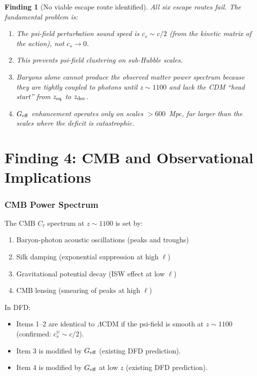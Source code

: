 \documentclass[11pt]{article}
\newtheorem{finding}{Finding}
\newcommand{\LCDM}{$\Lambda$CDM}
\newcommand{\Geff}{G_{\rm eff}}
\begin{document}
\begin{finding}[No viable escape route identified]
\label{find:no-escape}
All six escape routes fail. The fundamental problem is:
\begin{enumerate}[nosep]
\item The psi-field perturbation sound speed is $c_s \sim c/2$
  (from the kinetic matrix of the action), not $c_s \to 0$.
\item This prevents psi-field clustering on sub-Hubble scales.
\item Baryons alone cannot produce the observed matter power spectrum
  because they are tightly coupled to photons until $z \sim 1100$
  and lack the CDM ``head start'' from $z_{\rm eq}$ to $z_{\rm dec}$.
\item $\Geff$ enhancement operates only on scales $> 600$~Mpc,
  far larger than the scales where the deficit is catastrophic.
\end{enumerate}
\end{finding}


\part{Finding 4: CMB and Observational Implications}
\label{part:cmb}

\section{CMB Power Spectrum}

The CMB $C_\ell$ spectrum at $z \sim 1100$ is set by:
\begin{enumerate}[nosep]
\item Baryon-photon acoustic oscillations (peaks and troughs)
\item Silk damping (exponential suppression at high $\ell$)
\item Gravitational potential decay (ISW effect at low $\ell$)
\item CMB lensing (smearing of peaks at high $\ell$)
\end{enumerate}

In DFD:
\begin{itemize}[nosep]
\item Items 1--2 are identical to \LCDM{} if the psi-field is smooth
  at $z \sim 1100$ (confirmed: $c_s^{\psi} \sim c/2$).
\item Item 3 is modified by $\Geff$ (existing DFD prediction).
\item Item 4 is modified by $\Geff$ at low $z$ (existing DFD prediction).
\end{itemize}
\end{document}
